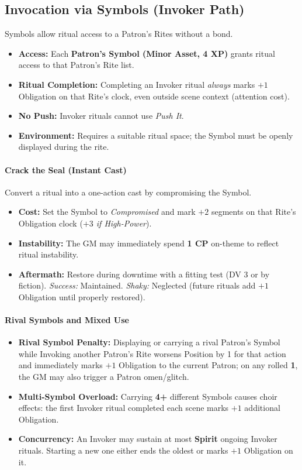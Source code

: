 \subsection{Invocation via Symbols (Invoker Path)}
Symbols allow ritual access to a Patron's Rites without a bond.
\begin{itemize}
  \item \textbf{Access:} Each \textbf{Patron’s Symbol (Minor Asset, 4 XP)} grants ritual access to that Patron's Rite list.
  \item \textbf{Ritual Completion:} Completing an Invoker ritual \emph{always} marks $+1$ Obligation on that Rite's clock, even outside scene context (attention cost).
  \item \textbf{No Push:} Invoker rituals cannot use \emph{Push It}.
  \item \textbf{Environment:} Requires a suitable ritual space; the Symbol must be openly displayed during the rite.
\end{itemize}

\paragraph{Crack the Seal (Instant Cast)}
Convert a ritual into a one-action cast by compromising the Symbol.
\begin{itemize}
  \item \textbf{Cost:} Set the Symbol to \emph{Compromised} and mark $+2$ segments on that Rite's Obligation clock (\emph{$+3$ if High-Power}).
  \item \textbf{Instability:} The GM may immediately spend \textbf{1 CP} on-theme to reflect ritual instability.
  \item \textbf{Aftermath:} Restore during downtime with a fitting test (DV 3 or by fiction). \emph{Success:} Maintained. \emph{Shaky:} Neglected (future rituals add $+1$ Obligation until properly restored).
\end{itemize}

\paragraph{Rival Symbols and Mixed Use}
\begin{itemize}
  \item \textbf{Rival Symbol Penalty:} Displaying or carrying a rival Patron's Symbol while Invoking another Patron’s Rite worsens Position by 1 for that action and immediately marks $+1$ Obligation to the current Patron; on any rolled \textbf{1}, the GM may also trigger a Patron omen/glitch.
  \item \textbf{Multi-Symbol Overload:} Carrying \textbf{4+} different Symbols causes choir effects: the first Invoker ritual completed each scene marks $+1$ additional Obligation.
  \item \textbf{Concurrency:} An Invoker may sustain at most \textbf{Spirit} ongoing Invoker rituals. Starting a new one either ends the oldest or marks $+1$ Obligation on it.
\end{itemize}


